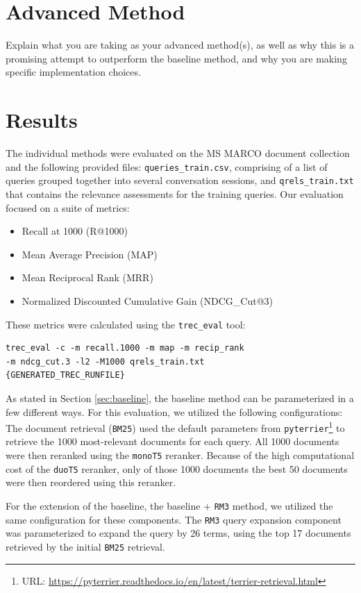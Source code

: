 \documentclass[sigconf]{acmart}
\begin{document}
\section{Advanced Method}\label{sec:advanced}
Explain what you are taking as your advanced method(s), as well as why this is a promising attempt to outperform the baseline method, and why you are making specific implementation choices.

\section{Results}\label{sec:results}
The individual methods were evaluated on the MS MARCO document collection and the following provided files: \texttt{queries\-\_\-train\-.csv}, comprising of a list of queries grouped together into several conversation sessions, and \texttt{qrels\-\_\-train\-.txt} that contains the relevance assessments for the training queries. Our evaluation focused on a suite of metrics:
\begin{itemize}
	\item	Recall at 1000 (R@1000)
	\item	Mean Average Precision (MAP)
	\item	Mean Reciprocal Rank (MRR)
	\item	Normalized Discounted Cumulative Gain (NDCG\_Cut@3)
\end{itemize}
These metrics were calculated using the \texttt{trec\_eval} tool:
\begin{verbatim}
trec_eval -c -m recall.1000 -m map -m recip_rank
-m ndcg_cut.3 -l2 -M1000 qrels_train.txt
{GENERATED_TREC_RUNFILE}
\end{verbatim}

As stated in Section \ref{sec:baseline}, the baseline method can be parameterized in a few different ways. For this evaluation, we utilized the following configurations: The document retrieval (\texttt{BM25}) used the default parameters from \texttt{pyterrier}\footnote{URL: \url{https://pyterrier.readthedocs.io/en/latest/terrier-retrieval.html}} to retrieve the 1000 most-relevant documents for each query. All 1000 documents were then reranked using the \texttt{monoT5} reranker. Because of the high computational cost of the \texttt{duoT5} reranker, only of those 1000 documents the best 50 documents were then reordered using this reranker.

For the extension of the baseline, the baseline + \texttt{RM3} method, we utilized the same configuration for these components. The \texttt{RM3} query expansion component was parameterized to expand the query by 26 terms, using the top 17 documents retrieved by the initial \texttt{BM25} retrieval.
\end{document}
